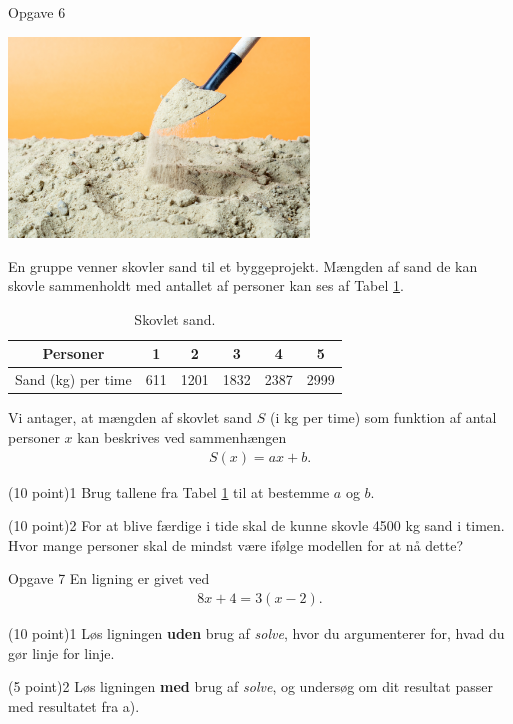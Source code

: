 \begin{opgavetekst}{Opgave 6}
	\begin{center}
	\includegraphics[width= 0.6\textwidth]{Billeder/sand.jpg}
	\end{center}
	En gruppe venner skovler sand til et byggeprojekt. Mængden af sand de kan skovle sammenholdt med antallet af personer kan ses af Tabel \ref{tab:sand}.
	\begin{table}[H]
		\centering
		\begin{tabular}{c|c|c|c|c|c}
		Personer & 1 & 2 & 3 & 4 & 5 \\
		\hline
		Sand (kg) per time  & 611 & 1201 & 1832 & 2387 & 2999	
		\end{tabular}
		\caption{Skovlet sand.}
		\label{tab:sand}
	\end{table}
	Vi antager, at mængden af skovlet sand $S$ (i kg per time) som funktion af antal personer $x$ kan beskrives ved sammenhængen
	\begin{align*}
		S(x) = ax+b.
	\end{align*}
\end{opgavetekst}
\begin{delopgave}{(10 point)}{1}
	Brug tallene fra Tabel \ref{tab:sand} til at bestemme $a$ og $b$. 
\end{delopgave}
\begin{delopgave}{(10 point)}{2}
	For at blive færdige i tide skal de kunne skovle 4500 kg sand i timen. Hvor mange personer skal de mindst være ifølge modellen for at nå dette?
\end{delopgave}
\begin{opgavetekst}{Opgave 7}
	En ligning er givet ved
	\begin{align*}
		8x+4 = 3(x-2).
	\end{align*}
\end{opgavetekst}
\begin{delopgave}{(10 point)}{1}
	Løs ligningen \textbf{uden} brug af \textit{solve}, hvor du argumenterer for, hvad du gør linje for linje.
\end{delopgave}
\begin{delopgave}{(5 point)}{2}
	Løs ligningen \textbf{med} brug af \textit{solve}, og undersøg om dit resultat passer med resultatet fra a).
\end{delopgave}




